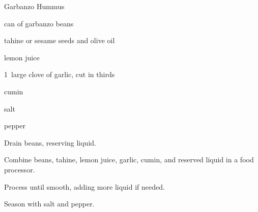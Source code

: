 \begin{recipe}{Garbanzo Hummus}{}{}

\begin{ingredients}
\item {} can of garbanzo beans
\item \C{\quarter} tahine or \C{\quarter} sesame seeds and  olive oil
\item {} lemon juice
\item 1~large clove of garlic, cut in thirds
\item \tp{\quarter} cumin
\item salt
\item pepper
\end{ingredients}

\begin{directions}
\item Drain beans, reserving liquid.
\item Combine beans, tahine, lemon juice, garlic, cumin, and \C{\quarter} reserved liquid in a food processor.
\item Process until smooth, adding more liquid if needed.
\item Season with salt and pepper.
\end{directions}

\end{recipe}
